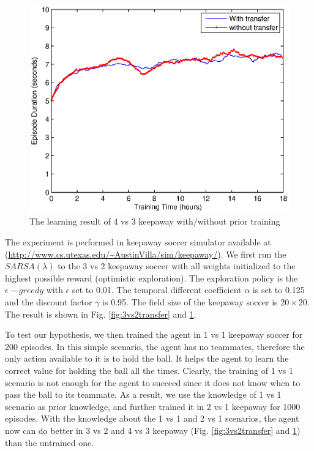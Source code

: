 \begin{figure}[h]
    \centering
    \begin{minipage}[t]{0.6\linewidth}
        \centering
        \includegraphics[width=\textwidth] {./figures/4vs3transfer.eps}
        \caption{The learning result of 4 vs 3 keepaway with/without prior training}
    \label{fig:4vs3transfer}
    \end{minipage}
\end{figure}

The experiment is performed in keepaway soccer simulator available at \\
(\url{http://www.cs.utexas.edu/~AustinVilla/sim/keepaway/}).
We first run the $SARSA(\lambda)$ to the 3 vs 2 keepaway soccer with all weights initialized to the highest possible reward (optimistic exploration). The exploration policy is 
the $\epsilon-greedy$ with $\epsilon$ set to 0.01. The temporal different coefficient $\alpha$ is set to 0.125 and the 
discount factor $\gamma$ is 0.95. The field size of the keepaway soccer is $20 \times 20$. 
The result is shown in Fig. \ref{fig:3vs2transfer} and \ref{fig:4vs3transfer}. 

To test our hypothesis, we then trained the agent in 1 vs 1 keepaway soccer for 200 episodes. 
In this simple scenario, the agent has no teammates, therefore the only action available to it is to hold the ball.
It helps the agent to learn the correct value for holding the ball all the times.
Clearly, the training of 1 vs 1 scenario is not enough for the agent to succeed since it does not know
when to pass the ball to its teammate. As a result, we use the knowledge of 1 vs 1 scenario as prior knowledge, 
and further trained it in 2 vs 1 keepaway for 1000 episodes.
With the knowledge about the 1 vs 1 and 2 vs 1 scenarios, the agent now can do better in 3 vs 2 and 4 vs 3 keepaway (Fig. \ref{fig:3vs2transfer} and \ref{fig:4vs3transfer})
than the untrained one.

